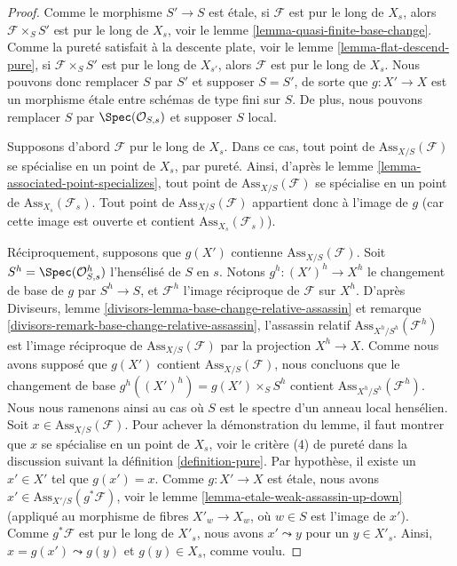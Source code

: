 \begin{proof}
Comme le morphisme $S' \to S$ est \'etale, si $\mathcal{F}$
est pur le long de $X_s$, alors $\mathcal{F} \times_S S'$ est pur le long de
$X_s$, voir le
lemme \ref{lemma-quasi-finite-base-change}.
Comme la pureté satisfait à la descente plate, voir le
lemme \ref{lemma-flat-descend-pure},
si $\mathcal{F} \times_S S'$ est pur le long de $X_{s'}$, alors
$\mathcal{F}$ est pur le long de $X_s$. Nous pouvons donc remplacer $S$ par $S'$
et supposer $S = S'$, de sorte que $g : X' \to X$ est un morphisme \'etale
entre schémas de type fini sur $S$. De plus, nous pouvons remplacer
$S$ par $\Spec(\mathcal{O}_{S, s})$ et supposer $S$ local.

\medskip\noindent
Supposons d'abord $\mathcal{F}$ pur le long de $X_s$.
Dans ce cas, tout point de $\text{Ass}_{X/S}(\mathcal{F})$
se spécialise en un point de $X_s$, par pureté. Ainsi, d'après le
lemme \ref{lemma-associated-point-specializes},
tout point de $\text{Ass}_{X/S}(\mathcal{F})$
se spécialise en un point de $\text{Ass}_{X_s}(\mathcal{F}_s)$.
Tout point de $\text{Ass}_{X/S}(\mathcal{F})$ appartient donc à
l'image de $g$ (car cette image est ouverte et contient
$\text{Ass}_{X_s}(\mathcal{F}_s)$).

\medskip\noindent
Réciproquement, supposons que $g(X')$ contienne $\text{Ass}_{X/S}(\mathcal{F})$.
Soit $S^h = \Spec(\mathcal{O}_{S, s}^h)$ l'hensélisé
de $S$ en $s$. Notons $g^h : (X')^h \to X^h$ le changement de base de $g$
par $S^h \to S$, et $\mathcal{F}^h$ l'image réciproque de $\mathcal{F}$
sur $X^h$. D'après
Diviseurs, lemme \ref{divisors-lemma-base-change-relative-assassin} et
remarque \ref{divisors-remark-base-change-relative-assassin},
l'assassin relatif $\text{Ass}_{X^h/S^h}(\mathcal{F}^h)$
est l'image réciproque de $\text{Ass}_{X/S}(\mathcal{F})$ par la projection
$X^h \to X$. Comme nous avons supposé que $g(X')$ contient
$\text{Ass}_{X/S}(\mathcal{F})$, nous concluons que le changement de base\newline
$g^h((X')^h) = g(X') \times_S S^h$ contient
$\text{Ass}_{X^h/S^h}(\mathcal{F}^h)$. Nous nous ramenons ainsi
au cas où $S$ est le spectre d'un anneau local hensélien.
Soit $x \in \text{Ass}_{X/S}(\mathcal{F})$. Pour achever la démonstration du
lemme, il faut montrer que $x$ se spécialise en un point de $X_s$, voir
le critère (4) de pureté dans la discussion suivant la
définition \ref{definition-pure}.
Par hypothèse, il existe un $x' \in X'$ tel que $g(x') = x$.
Comme $g : X' \to X$ est \'etale, nous avons
$x' \in \text{Ass}_{X'/S}(g^*\mathcal{F})$, voir le
lemme \ref{lemma-etale-weak-assassin-up-down} (appliqué au
morphisme de fibres $X'_w \to X_w$, où $w \in S$ est l'image de $x'$).
Comme $g^*\mathcal{F}$ est pur le long de $X'_s$, nous avons $x' \leadsto y$
pour un $y \in X'_s$. Ainsi, $x = g(x') \leadsto g(y)$ et
$g(y) \in X_s$, comme voulu.
\end{proof}

